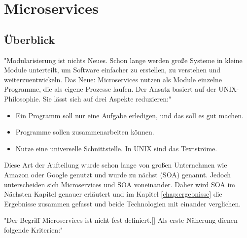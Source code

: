 \chapter{Microservices}
\label{chap:Microservices}

\section{Überblick}
\label{sec:überblickMicroservice }
"Modularisierung ist nichts Neues. Schon lange werden große Systeme in kleine Module unterteilt, um Software einfacher zu erstellen, zu verstehen und weiterzuentwickeln. Das Neue: Microservices nutzen als Module einzelne Programme, die als eigene Prozesse laufen. Der Ansatz basiert auf der UNIX-Philosophie. Sie lässt sich auf drei Aspekte reduzieren:"\cite[S. 2]{EWolff2016:Microservices}

\begin{itemize}
    \item Ein Programm soll nur eine Aufgabe erledigen, und das soll es gut machen.
    \item Programme sollen zusammenarbeiten können.
    \item Nutze eine universelle Schnittstelle. In UNIX sind das Textströme.
\end{itemize}
Diese Art der Aufteilung wurde schon lange von großen Unternehmen wie Amazon oder Google genutzt und wurde zu nächst \SOA (SOA) genannt. Jedoch unterscheiden sich Microservices und SOA voneinander. Daher wird SOA im Nächsten Kapitel genauer erläutert und im Kapitel \ref{chap:ergebnisse} die Ergebnisse zusammen gefasst und beide Technologien mit einander verglichen.

"Der Begriff Microservices ist nicht fest definiert.[] Als erste Näherung dienen folgende Kriterien:"\cite[S. 2]{EWolff2016:Microservices}

